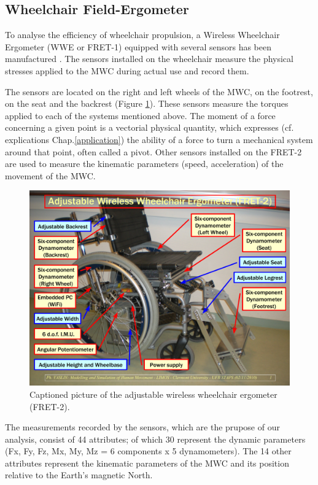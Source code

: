 \subsection{Wheelchair Field-Ergometer}
To analyse the efficiency of wheelchair propulsion, a Wireless Wheelchair Ergometer (WWE or FRET-1)  equipped with several sensors has been manufactured \cite{dabonneville2005self}. The sensors installed on the wheelchair measure the physical stresses applied to the MWC during actual use and record them.


The sensors are located on the right and left wheels of the MWC, on the footrest, on the seat and the backrest (Figure \ref{fret_legend}). These sensors measure the torques applied to each of the systems mentioned above.  The moment of a force concerning a given point is a vectorial physical quantity, which expresses (cf. explications Chap.\ref{application}) the ability of a force to turn a mechanical system around that point, often called a pivot. Other sensors installed on the FRET-2 are used to measure the kinematic parameters (speed, acceleration) of the movement of the MWC.


\begin{figure}[h]
\center
\includegraphics[scale = 0.4]{images/FRET-2_Legend_GB}
\caption{Captioned picture of the adjustable wireless wheelchair ergometer (FRET-2).}
\label{fret_legend}
\end{figure}


The measurements recorded by the sensors, which are the prupose of our analysis, consist of 44 attributes; of which 30 represent the dynamic parameters (Fx, Fy, Fz, Mx, My, Mz = 6 components x 5 dynamometers). The 14 other attributes represent the kinematic parameters of the MWC and its position relative to the Earth's magnetic North.

